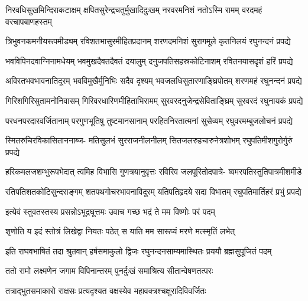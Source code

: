 \fourlineindentedshloka
{निरवधिसुखमिन्दिराकटाक्षम्}
{क्षपितसुरेन्द्रचतुर्मुखादिदुःखम्}
{नरवरमनिशं नतोऽस्मि रामम्}
{वरदमहं वरचापबाणहस्तम्} %

\fourlineindentedshloka
{त्रिभुवनकमनीयरूपमीड्यम्}
{रविशतभासुरमीहितप्रदानम्}
{शरणदमनिशं सुरागमूले}
{कृतनिलयं रघुनन्दनं प्रपद्ये} %

\fourlineindentedshloka
{भवविपिनदवाग्निनामधेयम्}
{भवमुखदैवतदैवतं दयालुम्}
{दनुजपतिसहस्रकोटिनाशम्}
{रवितनयासदृशं हरिं प्रपद्ये} %

\fourlineindentedshloka
{अविरतभवभावनातिदूरम्}
{भवविमुखैर्मुनिभिः सदैव दृश्यम्}
{भवजलधिसुतारणाङ्घ्रिपोतम्}
{शरणमहं रघुनन्दनं प्रपद्ये} %

\fourlineindentedshloka
{गिरिशगिरिसुतामनोनिवासम्}
{गिरिवरधारिणमीहिताभिरामम्}
{सुरवरदनुजेन्द्रसेविताङ्घ्रिम्}
{सुरवरदं रघुनायकं प्रपद्ये} %

\fourlineindentedshloka
{परधनपरदारवर्जितानाम्}
{परगुणभूतिषु तुष्टमानसानाम्}
{परहितनिरतात्मनां सुसेव्यम्}
{रघुवरमम्बुजलोचनं प्रपद्ये} %

\fourlineindentedshloka
{स्मितरुचिरविकासिताननाब्ज-}
{मतिसुलभं सुरराजनीलनीलम्}
{सितजलरुहचारुनेत्रशोभम्}
{रघुपतिमीशगुरोर्गुरुं प्रपद्ये} %

\fourlineindentedshloka
{हरिकमलजशम्भुरूपभेदात्}
{त्वमिह विभासि गुणत्रयानुवृत्तः}
{रविरिव जलपूरितोदपात्रे-}
{ष्वमरपतिस्तुतिपात्रमीशमीडे} %

\fourlineindentedshloka
{रतिपतिशतकोटिसुन्दराङ्गम्}
{शतपथगोचरभावनाविदूरम्}
{यतिपतिहृदये सदा विभातम्}
{रघुपतिमार्तिहरं प्रभुं प्रपद्ये} %

\twolineshloka
{इत्येवं स्तुवतस्तस्य प्रसन्नोऽभूद्रघूत्तमः}
{उवाच गच्छ भद्रं ते मम विष्णोः परं पदम्} %

\twolineshloka
{शृणोति य इदं स्तोत्रं लिखेद्वा नियतः पठेत्}
{स याति मम सारूप्यं मरणे मत्स्मृतिं लभेत्} %

\fourlineindentedshloka
{इति राघवभाषितं तदा}
{श्रुतवान् हर्षसमाकुलो द्विजः}
{रघुनन्दनसाम्यमास्थितः}
{प्रययौ ब्रह्मसुपूजितं पदम्} %






\twolineshloka
{ततो रामो लक्ष्मणेन जगाम विपिनान्तरम्}
{पुनर्दुःखं समाश्रित्य सीतान्वेषणतत्परः} %

\twolineshloka
{तत्राद्भुतसमाकारो राक्षसः प्रत्यदृश्यत}
{वक्षस्येव महावक्त्रश्चक्षुरादिविवर्जितः} %

